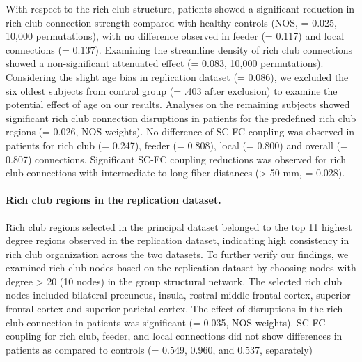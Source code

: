 \begin{refsection}
With respect to the rich club structure, patients showed a significant reduction in rich club connection strength compared with healthy controls (NOS, \pval = 0.025, 10,000 permutations), with no difference observed in feeder (\pval = 0.117) and local connections (\pval = 0.137). Examining the streamline density of rich club connections showed a non-significant attenuated effect (\pval = 0.083, 10,000 permutations). Considering the slight age bias in replication dataset (\pval = 0.086), we excluded the six oldest subjects from control group (\pval = .403 after exclusion) to examine the potential effect of age on our results. Analyses on the remaining subjects showed significant rich club connection disruptions in patients for the predefined rich club regions (\pval = 0.026, NOS weights). No difference of SC-FC coupling was observed in patients for rich club (\pval = 0.247), feeder (\pval = 0.808), local (\pval = 0.800) and overall (\pval = 0.807) connections. Significant SC-FC coupling reductions was observed for rich club connections with intermediate-to-long fiber distances (> 50 mm, \pval = 0.028). 

\paragraph{Rich club regions in the replication dataset.}
Rich club regions selected in the principal dataset belonged to the top 11 highest degree regions observed in the replication dataset, indicating high consistency in rich club organization across the two datasets. To further verify our findings, we examined rich club nodes based on the replication dataset by choosing nodes with degree > 20 (10 nodes) in the group structural network. The selected rich club nodes included bilateral precuneus, insula, rostral middle frontal cortex, superior frontal cortex and superior parietal cortex. The effect of disruptions in the rich club connection in patients was significant (\pval = 0.035, NOS weights). SC-FC coupling for rich club, feeder, and local connections did not show differences in patients as compared to controls (\pval = 0.549, 0.960, and 0.537, separately)


\end{refsection}
